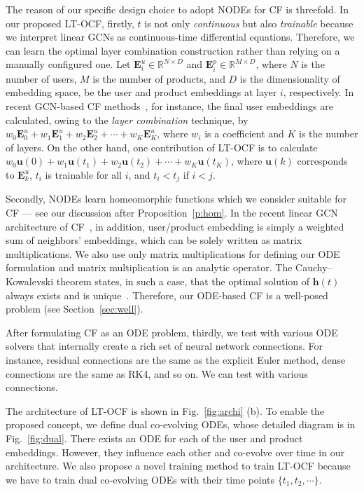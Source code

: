 \documentclass[sigconf]{acmart}
\begin{document}
The reason of our specific design choice to adopt NODEs for CF is threefold. In our proposed LT-OCF, firstly, $t$ is not only \emph{continuous} but also \emph{trainable} because we interpret linear GCNs as continuous-time differential equations. Therefore, we can learn the optimal layer combination construction rather than relying on a manually configured one. Let $\bm{E}^u_i \in \mathbb{R}^{N \times D}$ and $\bm{E}^p_i \in \mathbb{R}^{M \times D}$, where $N$ is the number of users, $M$ is the number of products, and $D$ is the dimensionality of embedding space, be the user and product embeddings at layer $i$, respectively. In recent GCN-based CF methods~\cite{Chen_Wu_Hong_Zhang_Wang_2020,10.1145/3397271.3401063}, for instance, the final user embeddings are calculated, owing to the \emph{layer combination} technique, by $w_0 \bm{E}^u_0 + w_1\bm{E}^u_1 + w_2\bm{E}^u_2 + \cdots + w_K\bm{E}^u_K$, where $w_i$ is a coefficient and $K$ is the number of layers. On the other hand, one contribution of LT-OCF is to calculate $w_0\bm{u}(0) + w_1\bm{u}(t_1) + w_2\bm{u}(t_2) + \cdots + w_K\bm{u}(t_K)$, where $\bm{u}(k)$ corresponds to $\bm{E}^u_k$, $t_i$ is trainable for all $i$, and $t_i < t_j$ if $i < j$.

Secondly, NODEs learn homeomorphic functions which we consider suitable for CF --- see our discussion after Proposition~\ref{p:hom}. In the recent linear GCN architecture of CF~\cite{10.1145/3397271.3401063}, in addition, user/product embedding is simply a weighted sum of neighbors' embeddings, which can be solely written as matrix multiplications. We also use only matrix multiplications for defining our ODE formulation and matrix multiplication is an analytic operator. The Cauchy--Kowalevski theorem states, in such a case, that the optimal solution of $\bm{h}(t)$ always exists and is unique~\cite{10.2307/j.ctvzsmfgn}. Therefore, our ODE-based CF is a well-posed problem (see Section~\ref{sec:well}).

After formulating CF as an ODE problem, thirdly, we test with various ODE solvers that internally create a rich set of neural network connections. For instance, residual connections are the same as the explicit Euler method, dense connections are the same as RK4, and so on. We can test with various connections.

The architecture of LT-OCF is shown in Fig.~\ref{fig:archi} (b). To enable the proposed concept, we define dual co-evolving ODEs, whose detailed diagram is in Fig.~\ref{fig:dual}. There exists an ODE for each of the user and product embeddings. However, they influence each other and co-evolve over time in our architecture. We also propose a novel training method to train LT-OCF because we have to train dual co-evolving ODEs with their time points $\{t_1, t_2, \cdots\}$.
\end{document}
